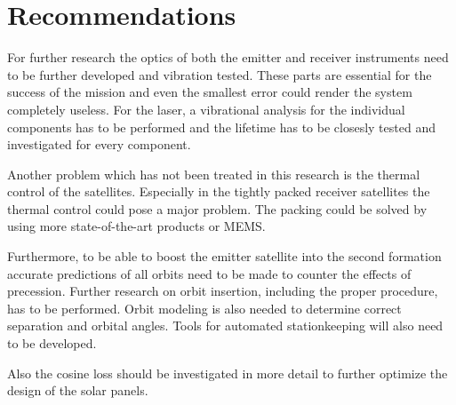 \section{Recommendations}
\label{frCRrecommendations}
For further research the optics of both the emitter and receiver instruments need to be further developed and vibration tested. These parts are essential for the success of the mission and even the smallest error could render the system completely useless. For the laser, a vibrational analysis for the individual components has to be performed and the lifetime has to be closesly tested and investigated for every component.

Another problem which has not been treated in this research is the thermal control of the satellites. Especially in the tightly packed receiver satellites the thermal control could pose a major problem. The packing could be solved by using more state-of-the-art products or \ac{MEMS}.

Furthermore, to be able to boost the emitter satellite into the second formation accurate predictions of all orbits need to be made to counter the effects of precession. Further research on orbit insertion, including the proper procedure, has to be performed. Orbit modeling is also needed to determine correct separation and orbital angles. Tools for automated stationkeeping will also need to be developed.

Also the cosine loss should be investigated in more detail to further optimize the design of the solar panels.